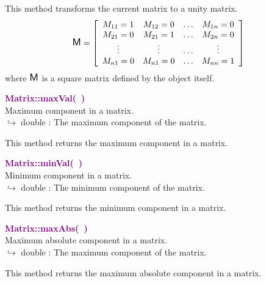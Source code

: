 This method transforms the current matrix to a unity matrix.
\begin{equation*}
\mbox{\large\ensuremath{\mathsf{M}}}=\left[\begin{array}{cccc}
  M_{11}=1 & M_{12}=0 & \hdots & M_{1n}=0\\
  M_{21}=0 & M_{21}=1 & \hdots & M_{2n}=0\\
  \vdots & \vdots & \hdots & \vdots\\
  M_{n1}=0 & M_{n1}=0 & \hdots & M_{nn}=1
  \end{array}\right]
\end{equation*}
where $\mbox{\large\ensuremath{\mathsf{M}}}$ is a square matrix defined by the object itself.

\textcolor{purple}{\textbf{Matrix::maxVal(~)}}\label{Matrix::maxVal()}\\
Maximum component in a matrix.\\ \hspace*{10mm}$\hookrightarrow$ double : The maximum component of the matrix.

This method returns the maximum component in a matrix.

\textcolor{purple}{\textbf{Matrix::minVal(~)}}\label{Matrix::minVal()}\\
Minimum component in a matrix.\\ \hspace*{10mm}$\hookrightarrow$ double : The minimum component of the matrix.

This method returns the minimum component in a matrix.

\textcolor{purple}{\textbf{Matrix::maxAbs(~)}}\label{Matrix::maxAbs()}\\
Maximum absolute component in a matrix.\\ \hspace*{10mm}$\hookrightarrow$ double : The maximum component of the matrix.

This method returns the maximum absolute component in a matrix.


